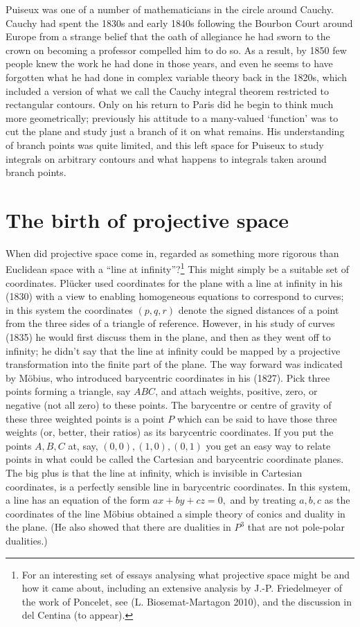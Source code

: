 Puiseux was one of a number of mathematicians in the circle around Cauchy. Cauchy had spent the 1830s and early 1840s following the Bourbon Court around Europe from a strange belief that the oath of allegiance he had sworn to the crown on becoming a professor compelled him to do so. As a result, by 1850 few people knew the work he had done in those years, and even he seems to have forgotten what he had done in complex variable theory back in the 1820s, which included a version of what we call the Cauchy integral theorem restricted to rectangular contours. Only on his return to Paris did he begin to think much more geometrically; previously his attitude to a many-valued `function' was to cut the plane and study just a branch of it on what remains. His understanding of branch points was quite limited, and this left space for Puiseux to study integrals on arbitrary contours   and what happens to integrals taken around branch points. 

\section{The birth of projective space}
When did projective space come in, regarded as something more rigorous than Euclidean space with a ``line at infinity''?\footnote{For an interesting  set of essays analysing what projective space might be and how it came about, including an extensive analysis by J.-P. Friedelmeyer of the work of Poncelet, see (L. Biosemat-Martagon 2010), and the discussion in del Centina (to appear).}
 This might simply be a suitable set of coordinates. Pl\"ucker used coordinates for the plane with a line at infinity in his (1830) with a view to enabling homogeneous equations to correspond to curves; in this system the coordinates $(p, q, r)$ denote the signed distances of a point from the three sides of a triangle of reference. However, in his study of curves (1835) he would first discuss them in  the plane, and then as they went off to infinity; he didn't say that the line at infinity could be mapped by a projective transformation into the finite part of the plane.  The way forward was indicated by M\"obius, who introduced barycentric coordinates in his (1827). Pick three points forming a triangle, say $ABC$, and attach weights, positive, zero, or negative (not all zero) to these points. The barycentre or centre of gravity of these three weighted points is a point $P$ which can be said to have those three weights (or, better, their ratios) as its barycentric coordinates. If you put the points $A, B, C$ at, say,  $(0, 0), (1, 0), (0, 1)$ you get an easy way to relate points in what could be called the Cartesian and barycentric coordinate planes. The big plus is that the line at infinity, which is invisible in Cartesian coordinates, is a perfectly sensible line in barycentric coordinates. In this system, a line has an equation of the form $ax+by+cz=0,$ and by treating $a, b, c$ as the coordinates of the line M\"obius obtained a simple theory of conics and duality in the plane. (He also showed that there are dualities in $P^3$ that are not pole-polar dualities.)

